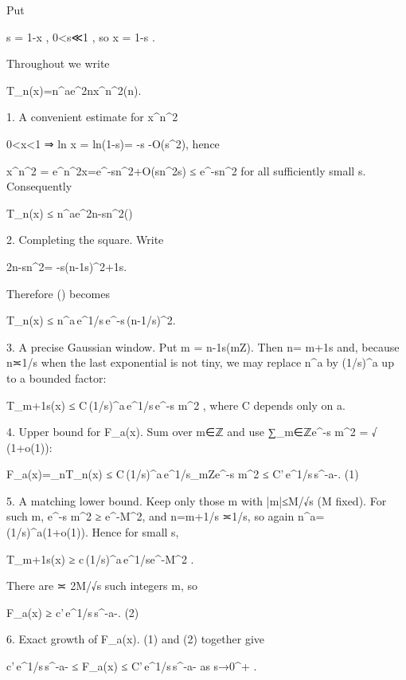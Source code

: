Put  

s = 1-x ,        0<s≪1 ,      so      x = 1-s .

Throughout we write  

T_n(x)=n^{a}e^{2n}x^{n^{2}}\qquad(n).

1.  A convenient estimate for x^{n^{2} }  

   0<x<1 ⇒ ln x = ln(1-s)= -s -O(s^{2}), hence

   x^{n^{2}} = e^{n^{2}\ln x}=e^{-sn^{2}+O(sn^{2}s)} ≤ e^{-sn^{2}}
   for all sufficiently small s.  
   Consequently  

   T_n(x) ≤ n^{a}e^{2n-sn^{2}}\qquad(\*)  

2.  Completing the square.  
   Write  

       2n-sn^{2}= -s\Bigl(n-\frac1s\Bigr)^{2}+\frac1s.                    

   Therefore (\*) becomes  

       T_n(x) ≤ n^{a}\,e^{1/s}\,e^{-s\,(n-1/s)^{2}}.                     

3.  A precise Gaussian window.  
   Put m = n-\frac1s\;(m\in\mathbb Z).  Then n= m+\frac1s and, because
   n≍1/s when the last exponential is not tiny, we may replace n^{a} by
   (1/s)^{a} up to a bounded factor:

       T_{m+\frac1s}(x)  ≤  C\,(1/s)^{a}\,e^{1/s}\,e^{-s m^{2}} ,
       where C depends only on a.

4.  Upper bound for F_a(x).  
   Sum over m∈ℤ and use  ∑_{m∈ℤ}e^{-s m^{2}} = √\,(1+o(1)):

       F_a(x)=\sum_{n}T_n(x)
              ≤ C\,(1/s)^{a}\,e^{1/s}\sum_{m\in\mathbb Z}e^{-s m^{2}}
              ≤ C'\,e^{1/s}\,s^{-a-}.                          (1)

5.  A matching lower bound.  
   Keep only those m with |m|≤M/√s (M fixed).  
   For such m, e^{-s m^{2}} ≥ e^{-M^{2}}, and n=m+1/s ≍1/s, so again
   n^{a}= (1/s)^{a}(1+o(1)).  Hence for small s,

       T_{m+\frac1s}(x) ≥ c\,(1/s)^{a}\,e^{1/s}e^{-M^{2}} .

   There are ≍ 2M/√s such integers m, so

       F_a(x) ≥ c'\,e^{1/s}\,s^{-a-}.                           (2)

6.  Exact growth of F_a(x).  
   (1) and (2) together give

       c'\,e^{1/s}\,s^{-a-}  ≤  F_a(x)  ≤  C'\,e^{1/s}\,s^{-a-}
       as s→0^{+} .

